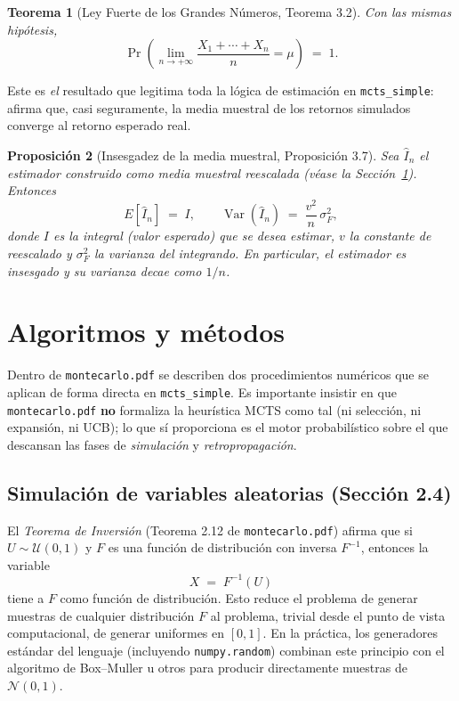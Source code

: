 \documentclass[11pt,a4paper]{article}
\newtheorem{theorem}{Teorema}
\newtheorem{proposition}[theorem]{Proposición}
\theoremstyle{definition}
\begin{document}
\begin{theorem}[Ley Fuerte de los Grandes Números, Teorema 3.2]
Con las mismas hipótesis,
\begin{equation}
\Pr\!\left(\lim_{n\to+\infty}\frac{X_1+\cdots+X_n}{n}=\mu\right) \;=\; 1.
\label{eq:lgn_fuerte}
\end{equation}
\end{theorem}

Este es \emph{el} resultado que legitima toda la lógica de estimación en \texttt{mcts\_simple}: afirma que, casi seguramente, la media muestral de los retornos simulados converge al retorno esperado real.

\begin{proposition}[Insesgadez de la media muestral, Proposición 3.7]
Sea $\hat{I}_n$ el estimador construido como media muestral reescalada (véase la Sección~\ref{sec:metodos}). Entonces
\begin{equation}
E[\hat{I}_n] \;=\; I,
\qquad
\operatorname{Var}(\hat{I}_n) \;=\; \frac{v^{2}}{n}\,\sigma_F^{2},
\label{eq:insesgadez}
\end{equation}
donde $I$ es la integral (valor esperado) que se desea estimar, $v$ la constante de reescalado y $\sigma_F^2$ la varianza del integrando. En particular, el estimador es insesgado y su varianza decae como $1/n$.
\end{proposition}

\section{Algoritmos y métodos}\label{sec:metodos}

Dentro de \texttt{montecarlo.pdf} se describen dos procedimientos numéricos que se aplican de forma directa en \texttt{mcts\_simple}. Es importante insistir en que \texttt{montecarlo.pdf} \textbf{no} formaliza la heurística MCTS como tal (ni selección, ni expansión, ni UCB); lo que sí proporciona es el motor probabilístico sobre el que descansan las fases de \emph{simulación} y \emph{retropropagación}.

\subsection{Simulación de variables aleatorias (Sección 2.4)}

El \emph{Teorema de Inversión} (Teorema 2.12 de \texttt{montecarlo.pdf}) afirma que si $U\sim\mathcal{U}(0,1)$ y $F$ es una función de distribución con inversa $F^{-1}$, entonces la variable
\begin{equation}
X \;=\; F^{-1}(U)
\label{eq:inversion}
\end{equation}
tiene a $F$ como función de distribución. Esto reduce el problema de generar muestras de cualquier distribución $F$ al problema, trivial desde el punto de vista computacional, de generar uniformes en $[0,1]$. En la práctica, los generadores estándar del lenguaje (incluyendo \texttt{numpy.random}) combinan este principio con el algoritmo de Box--Muller u otros para producir directamente muestras de $\mathcal{N}(0,1)$.
\end{document}
